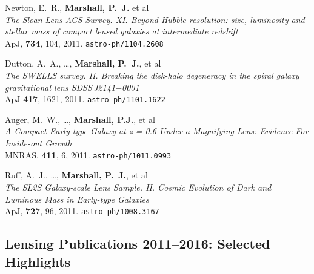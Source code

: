 \begin{revnumerate}
  \item{{Newton}, E.~R., \textbf{{Marshall}, P.~J.} et al\\
  \textit{The Sloan Lens ACS Survey. XI. Beyond Hubble resolution: size, luminosity and stellar mass of compact lensed galaxies at intermediate redshift}\\
  ApJ, \textbf{734}, 104, 2011.
  \texttt{astro-ph/1104.2608}
  }


  \item{{Dutton}, A.~A., \ldots, \textbf{{Marshall}, P.~J.}, et al\\
  \textit{The SWELLS survey. II.  Breaking the disk-halo degeneracy in the
  spiral galaxy gravitational lens SDSS\,J2141$-$0001}\\
  ApJ \textbf{417}, 1621, 2011.
  \texttt{astro-ph/1101.1622}
  }

  \item{Auger, M.~W., \ldots, \textbf{Marshall, P.J.}, et al\\
  \textit{A Compact Early-type Galaxy at z = 0.6 Under a Magnifying Lens: Evidence For Inside-out Growth}\\
  MNRAS, \textbf{411}, 6, 2011.
  \texttt{astro-ph/1011.0993}
  }

  \item{{Ruff}, A.~J., \ldots, \textbf{{Marshall}, P.~J.}, et al\\
  \textit{The SL2S Galaxy-scale Lens Sample.  II. Cosmic Evolution of
  Dark and Luminous Mass in Early-type Galaxies}\\
  ApJ, \textbf{727}, 96, 2011.
  \texttt{astro-ph/1008.3167}
  }

\end{revnumerate}



\subsection*{Lensing Publications 2011--2016: Selected Highlights}

